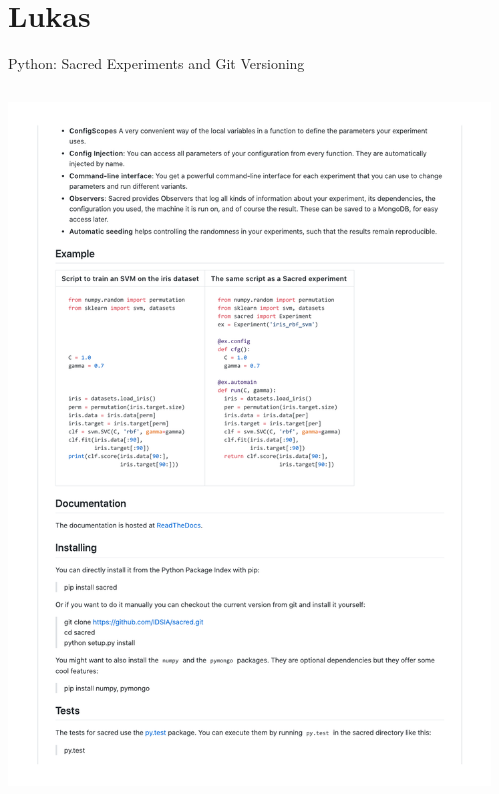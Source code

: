 \documentclass[aspectratio=169,10pt]{beamer}
\begin{document}
\section{Lukas}
\begin{frame}[t,fragile]{Python: Sacred Experiments and Git Versioning}
\vspace{-1.45mm}
\begin{columns}
\begin{column}{.4\paperwidth}
    \includegraphics[width=\textwidth]{sacred}
\end{column}
\begin{column}{.05\paperwidth}
    

\end{column}
\end{columns}
\end{frame}
\end{document}
